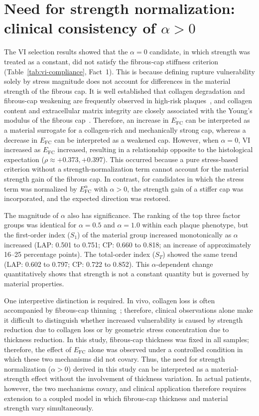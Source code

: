 \documentclass[master,english,final]{kaist-ucs}
\begin{document}
\section{Need for strength normalization: clinical consistency of $\alpha>0$}
The VI selection results showed that the $\alpha=0$ candidate, in which strength was treated as a constant, did not satisfy the fibrous-cap stiffness criterion (Table~\ref{tab:vi-compliance}, Fact~1). This is because defining rupture vulnerability solely by stress magnitude does not account for differences in the material strength of the fibrous cap. It is well established that collagen degradation and fibrous-cap weakening are frequently observed in high-risk plaques~\cite{bentzon2014}, and collagen content and extracellular matrix integrity are closely associated with the Young's modulus of the fibrous cap~\cite{savvopoulos2024afm, chai2013}. Therefore, an increase in $E_\mathrm{FC}$ can be interpreted as a material surrogate for a collagen-rich and mechanically strong cap, whereas a decrease in $E_\mathrm{FC}$ can be interpreted as a weakened cap. However, when $\alpha=0$, VI increased as $E_\mathrm{FC}$ increased, resulting in a relationship opposite to the histological expectation ($\rho \approx +0.373, +0.397$). This occurred because a pure stress-based criterion without a strength-normalization term cannot account for the material strength gain of the fibrous cap. In contrast, for candidates in which the stress term was normalized by $E_\mathrm{FC}^{\alpha}$ with $\alpha>0$, the strength gain of a stiffer cap was incorporated, and the expected direction was restored.

The magnitude of $\alpha$ also has significance. The ranking of the top three factor groups was identical for $\alpha = 0.5$ and $\alpha = 1.0$ within each plaque phenotype, but the first-order index ($S_1$) of the material group increased monotonically as $\alpha$ increased (LAP: 0.501 to 0.751; CP: 0.660 to 0.818; an increase of approximately 16--25 percentage points). The total-order index ($S_T$) showed the same trend (LAP: 0.602 to 0.797; CP: 0.722 to 0.852). This $\alpha$-dependent change quantitatively shows that strength is not a constant quantity but is governed by material properties.

One interpretive distinction is required. In vivo, collagen loss is often accompanied by fibrous-cap thinning~\cite{bentzon2014}; therefore, clinical observations alone make it difficult to distinguish whether increased vulnerability is caused by strength reduction due to collagen loss or by geometric stress concentration due to thickness reduction. In this study, fibrous-cap thickness was fixed in all samples; therefore, the effect of $E_\mathrm{FC}$ alone was observed under a controlled condition in which these two mechanisms did not covary. Thus, the need for strength normalization ($\alpha>0$) derived in this study can be interpreted as a material-strength effect without the involvement of thickness variation. In actual patients, however, the two mechanisms covary, and clinical application therefore requires extension to a coupled model in which fibrous-cap thickness and material strength vary simultaneously.
\end{document}
